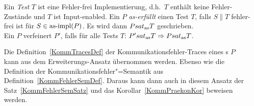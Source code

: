 \begin{Def}
  Ein \emph{Test} $T$ ist eine Fehler-frei Implementierung, d.h.\ $T$ enthält
  keine Fehler-Zustände und $T$ ist Input-enabled. Ein \MEIO{} $P$
  \emph{as-erfüllt} einen Test $T$, falls $S\|T$ fehler-frei ist für $S\in
  \mathrm{as}\text{-}\mathrm{impl} (P)$. Es wird dann $P sat_\mathrm{as} T$ geschrieben.\\
  Ein \MEIO{} $P$ verfeinert $P'$, falls für alle Tests $T$: $P'sat_\mathrm{as} T
  \Rightarrow Psat_\mathrm{as} T$.
\end{Def}

Die Definition~\ref{KommTracesDef} der Kommunikationsfehler-Traces eines
\MEIO{}s $P$ kann aus dem Erweiterungs-Ansatz übernommen werden. Ebenso wie die
Definition der Kommunikationsfehler"=Semantik aus
Definition~\ref{KommFehlerSemDef}. Daraus kann dann auch in diesem Ansatz der
Satz~\ref{KommFehlerSemSatz} und das Korollar~\ref{KommPraekonKor} beweisen
werden.

